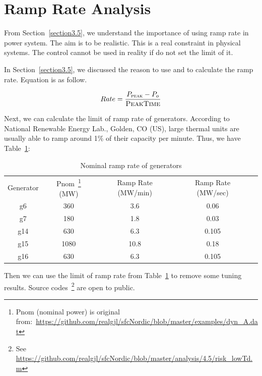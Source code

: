 \section{Ramp Rate Analysis} %
\label{section4.5}

From Section~\ref{section3.5}, we understand the importance of using ramp rate in power system. The aim is to be realistic. This is a real constraint in physical systems. The control cannot be used in reality if do not set the limit of it.

In Section~\ref{section3.5}, we discussed the reason to use  and  to calculate the ramp rate. Equation is as follow.

\begin{equation}
    Rate = \frac{P_{\textsc{peak}} - P_o}{\textsc{PeakTime}}
\end{equation}


Next, we can calculate the limit of ramp rate of generators. According to National Renewable Energy Lab., Golden, CO (US), \cite{osti_15016292} large thermal units are usually able to ramp around 1\% of their capacity per minute. Thus, we have Table~\ref{4_5_nominal_rate}:


\begin{table}[htbp]
  \centering
    \begin{tabular}{ccccc}
    Generator & Pnom~\footnote{Pnom (nominal power) is original from:~\href{https://github.com/realgjl/sfcNordic/blob/master/examples/dyn\_A.dat}{https://github.com/realgjl/sfcNordic/blob/master/examples/dyn\_A.dat}} (MW) & Ramp Rate (MW/min) & Ramp Rate (MW/sec)\\
    g6    & 360   & 3.6   & 0.06\\
    g7    & 180   & 1.8   & 0.03\\
    g14   & 630   & 6.3   & 0.105\\
    g15   & 1080  & 10.8  & 0.18\\
    g16   & 630   & 6.3   & 0.105\\
    \end{tabular}
  \caption{Nominal ramp rate of generators}
  \label{4_5_nominal_rate}
\end{table}

Then we can use the limit of ramp rate from Table~\ref{4_5_nominal_rate} to remove some tuning results. Source codes~\footnote{See \href{https://github.com/realgjl/sfcNordic/blob/master/analysis/4.5/risk\_lowTd.m}{https://github.com/realgjl/sfcNordic/blob/master/analysis/4.5/risk\_lowTd.m}} are open to public. 

